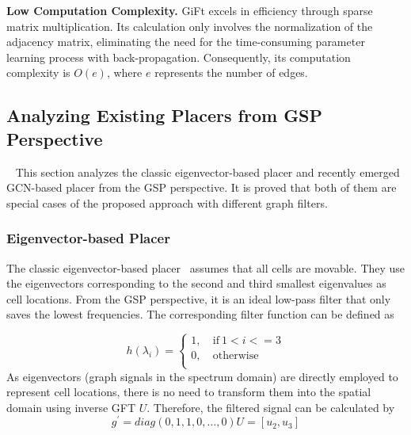 \textbf{Low Computation Complexity.}
GiFt excels in efficiency through sparse matrix multiplication. Its calculation only involves the normalization of the adjacency matrix, eliminating the need for the time-consuming parameter learning process with back-propagation. Consequently, its computation complexity is $O(e)$, where $e$ represents the number of edges.





\subsection{Analyzing Existing Placers from GSP Perspective}~\label{sec:method3}
This section analyzes the classic eigenvector-based placer and recently emerged GCN-based placer from the GSP perspective. It is proved that both of them are special cases of the proposed approach with different graph filters.


\subsubsection{Eigenvector-based Placer}
The classic eigenvector-based placer~\cite{eigen_placer} assumes that all cells are movable. They use the eigenvectors corresponding to the second and third smallest eigenvalues as cell locations.
From the GSP perspective, it is an ideal low-pass filter that only saves the lowest frequencies. The corresponding filter function can be defined as 

\begin{equation}\label{eq:ideal_filter}
h(\lambda_i)=\left\{
\begin{aligned}
 1,\ &\text{if} \ 1<i <=3\\
 0,\ &\text{otherwise} \\
\end{aligned}
\right.
\end{equation}
As eigenvectors (graph signals in the spectrum domain) are directly employed to represent cell locations, there is no need to transform them into the spatial domain using inverse GFT $U$.
Therefore, the filtered signal can be calculated by 
\begin{equation}
g^{\prime}=diag(0, 1, 1, 0, \ldots, 0)U=[u_2, u_3]
\end{equation}

